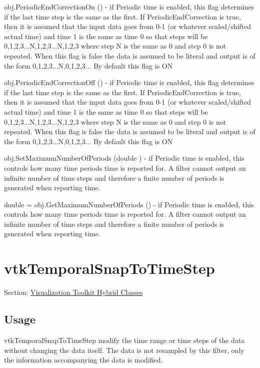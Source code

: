 \begin{DoxyItemize}
\item {\ttfamily obj.\-Periodic\-End\-Correction\-On ()} -\/ if Periodic time is enabled, this flag determines if the last time step is the same as the first. If Periodic\-End\-Correction is true, then it is assumed that the input data goes from 0-\/1 (or whatever scaled/shifted actual time) and time 1 is the same as time 0 so that steps will be 0,1,2,3...N,1,2,3...N,1,2,3 where step N is the same as 0 and step 0 is not repeated. When this flag is false the data is assumed to be literal and output is of the form 0,1,2,3...N,0,1,2,3... By default this flag is O\-N  
\item {\ttfamily obj.\-Periodic\-End\-Correction\-Off ()} -\/ if Periodic time is enabled, this flag determines if the last time step is the same as the first. If Periodic\-End\-Correction is true, then it is assumed that the input data goes from 0-\/1 (or whatever scaled/shifted actual time) and time 1 is the same as time 0 so that steps will be 0,1,2,3...N,1,2,3...N,1,2,3 where step N is the same as 0 and step 0 is not repeated. When this flag is false the data is assumed to be literal and output is of the form 0,1,2,3...N,0,1,2,3... By default this flag is O\-N  
\item {\ttfamily obj.\-Set\-Maximum\-Number\-Of\-Periods (double )} -\/ if Periodic time is enabled, this controls how many time periods time is reported for. A filter cannot output an infinite number of time steps and therefore a finite number of periods is generated when reporting time.  
\item {\ttfamily double = obj.\-Get\-Maximum\-Number\-Of\-Periods ()} -\/ if Periodic time is enabled, this controls how many time periods time is reported for. A filter cannot output an infinite number of time steps and therefore a finite number of periods is generated when reporting time.  
\end{DoxyItemize}\hypertarget{vtkhybrid_vtktemporalsnaptotimestep}{}\section{vtk\-Temporal\-Snap\-To\-Time\-Step}\label{vtkhybrid_vtktemporalsnaptotimestep}
Section\-: \hyperlink{sec_vtkhybrid}{Visualization Toolkit Hybrid Classes} \hypertarget{vtkwidgets_vtkxyplotwidget_Usage}{}\subsection{Usage}\label{vtkwidgets_vtkxyplotwidget_Usage}
vtk\-Temporal\-Snap\-To\-Time\-Step modify the time range or time steps of the data without changing the data itself. The data is not resampled by this filter, only the information accompanying the data is modified.

